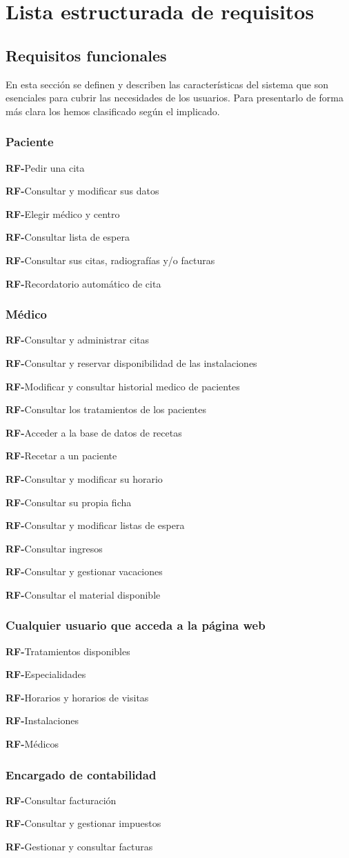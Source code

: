 \documentclass[12pt,a4paper]{article}
\newcounter{RFCounter}
\newcommand{\rf}[1]{\addtocounter{RFCounter}{1}\textbf{\rmfamily RF-\theRFCounter}\quad#1\\}
\begin{document}



\section{Lista estructurada de requisitos} %
\label{sec:lista_estructurada_de_requisitos}

\subsection{Requisitos funcionales}
En esta sección se definen y describen las características del sistema que son esenciales para cubrir las necesidades de los usuarios. Para presentarlo de forma más clara los hemos clasificado según el implicado.

\subsubsection{Paciente}
    \rf{Pedir una cita}
    \rf{Consultar y modificar sus datos}
    \rf{Elegir médico y centro}
    \rf{Consultar lista de espera}
    \rf{Consultar sus citas, radiografías y/o facturas}
    \rf{Recordatorio automático de cita}
\subsubsection{Médico}
    \rf{Consultar y administrar citas}
    \rf{Consultar y reservar disponibilidad de las instalaciones}
    \rf{Modificar y consultar historial medico de pacientes}
    \rf{Consultar los tratamientos de los pacientes}
    \rf{Acceder a la base de datos de recetas}
    \rf{Recetar a un paciente}
    \rf{Consultar y modificar su horario}
    \rf{Consultar su propia ficha}
    \rf{Consultar y modificar listas de espera    }
    \rf{Consultar ingresos}
    \rf{Consultar y gestionar vacaciones}
    \rf{Consultar el material disponible}
\subsubsection{Cualquier usuario que acceda a la página web}
    \rf{Tratamientos disponibles}
    \rf{Especialidades}
    \rf{Horarios y horarios de visitas}
    \rf{Instalaciones}
    \rf{Médicos}
\subsubsection{Encargado de contabilidad}
    \rf{Consultar facturación}
    \rf{Consultar y gestionar impuestos}
    \rf{Gestionar y consultar facturas}
\end{document}
